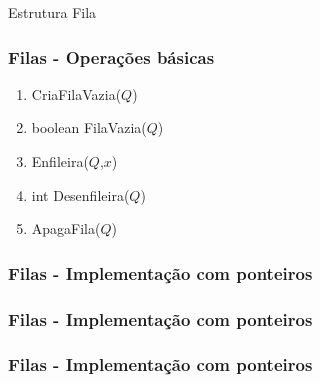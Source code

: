 \documentclass[aspectratio=169]{beamer}
\begin{document}
\begin{frame}[fragile]{Estrutura Fila}
\begin{algorithm}[H]
\caption{Fila} 
\label{Fila}
\end{algorithm} 
\end{frame}


\begin{frame}
\frametitle{Filas - Operações básicas}
\begin{enumerate}
 \item CriaFilaVazia($Q$) 
 \item boolean FilaVazia($Q$)
 \item Enfileira($Q$,$x$)
 \item int Desenfileira($Q$) 
 \item ApagaFila($Q$)
\end{enumerate}
\end{frame}


\begin{frame}
\frametitle{Filas - Implementação com ponteiros}
\begin{algorithm}[H]
\caption{CriaFilaVazia} 
\label{CriaFilaVazia}
\end{algorithm}
\end{frame}


\begin{frame}
\frametitle{Filas - Implementação com ponteiros}
\begin{algorithm}[H]
\caption{FilaVazia} 
\label{FilaVazia}
\end{algorithm}
\end{frame}


\begin{frame}
\frametitle{Filas - Implementação com ponteiros}
\begin{algorithm}[H]
\caption{Enfileira} 
\label{Enfileira}
\end{algorithm}
\end{frame}
\end{document}
